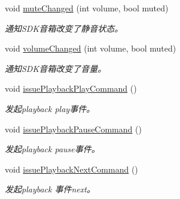 \begin{DoxyCompactItemize}
\item 
void \hyperlink{classduerOSDcsSDK_1_1sdkInterfaces_1_1DcsSdk_a3ce74d06ba458398b8840c7a97b56f04}{mute\+Changed} (int volume, bool muted)
\begin{DoxyCompactList}\small\item\em 通知\+S\+D\+K音箱改变了静音状态。 \end{DoxyCompactList}\item 
void \hyperlink{classduerOSDcsSDK_1_1sdkInterfaces_1_1DcsSdk_af3131a65e142634cb705aecc4527457d}{volume\+Changed} (int volume, bool muted)
\begin{DoxyCompactList}\small\item\em 通知\+S\+D\+K音箱改变了音量。 \end{DoxyCompactList}\item 
\mbox{\label{classduerOSDcsSDK_1_1sdkInterfaces_1_1DcsSdk_a382966d4ac2bc773a829fcbd9457bca2}} 
void \hyperlink{classduerOSDcsSDK_1_1sdkInterfaces_1_1DcsSdk_a382966d4ac2bc773a829fcbd9457bca2}{issue\+Playback\+Play\+Command} ()
\begin{DoxyCompactList}\small\item\em 发起playback play事件。 \end{DoxyCompactList}\item 
\mbox{\label{classduerOSDcsSDK_1_1sdkInterfaces_1_1DcsSdk_af6db30b50b9fa6a7e59ab0463fb1d8c1}} 
void \hyperlink{classduerOSDcsSDK_1_1sdkInterfaces_1_1DcsSdk_af6db30b50b9fa6a7e59ab0463fb1d8c1}{issue\+Playback\+Pause\+Command} ()
\begin{DoxyCompactList}\small\item\em 发起playback pause事件。 \end{DoxyCompactList}\item 
\mbox{\label{classduerOSDcsSDK_1_1sdkInterfaces_1_1DcsSdk_ab73219fd637f89a64d2421cd1355968c}} 
void \hyperlink{classduerOSDcsSDK_1_1sdkInterfaces_1_1DcsSdk_ab73219fd637f89a64d2421cd1355968c}{issue\+Playback\+Next\+Command} ()
\begin{DoxyCompactList}\small\item\em 发起playback 事件next。 \end{DoxyCompactList}\item 

\end{DoxyCompactItemize}
